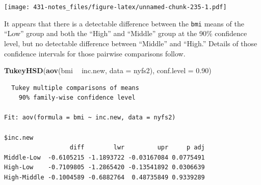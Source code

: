 \documentclass[
]{book}
\newenvironment{Shaded}{\begin{snugshade}}{\end{snugshade}}
\newcommand{\DataTypeTok}[1]{\textcolor[rgb]{0.13,0.29,0.53}{#1}}
\newcommand{\FloatTok}[1]{\textcolor[rgb]{0.00,0.00,0.81}{#1}}
\newcommand{\KeywordTok}[1]{\textcolor[rgb]{0.13,0.29,0.53}{\textbf{#1}}}
\newcommand{\NormalTok}[1]{#1}
\newcommand{\OperatorTok}[1]{\textcolor[rgb]{0.81,0.36,0.00}{\textbf{#1}}}
\newcommand{\StringTok}[1]{\textcolor[rgb]{0.31,0.60,0.02}{#1}}
\begin{document}
\texttt{[image: 431-notes\_files/figure-latex/unnamed-chunk-235-1.pdf]}

It appears that there is a detectable difference between the \texttt{bmi} means of the ``Low'' group and both the ``High'' and ``Middle'' group at the 90\% confidence level, but no detectable difference between ``Middle'' and ``High.'' Details of those confidence intervals for those pairwise comparisons follow.

\begin{Shaded}
\begin{Highlighting}[]
\KeywordTok{TukeyHSD}\NormalTok{(}\KeywordTok{aov}\NormalTok{(bmi }\OperatorTok{~}\StringTok{ }\NormalTok{inc.new, }\DataTypeTok{data =}\NormalTok{ nyfs2),}
                  \DataTypeTok{conf.level =} \FloatTok{0.90}\NormalTok{)}
\end{Highlighting}
\end{Shaded}

\begin{verbatim}
  Tukey multiple comparisons of means
    90% family-wise confidence level

Fit: aov(formula = bmi ~ inc.new, data = nyfs2)

$inc.new
                  diff        lwr         upr     p adj
Middle-Low  -0.6105215 -1.1893722 -0.03167084 0.0775491
High-Low    -0.7109805 -1.2865420 -0.13541892 0.0306639
High-Middle -0.1004589 -0.6882764  0.48735849 0.9339289
\end{verbatim}

  
\end{document}
